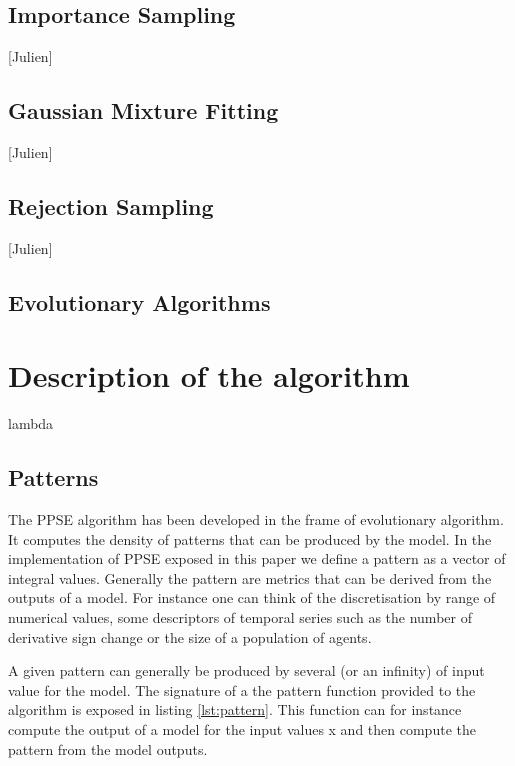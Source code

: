 \documentclass[10pt,a4paper]{article}
\theoremstyle{definition}
\theoremstyle{remark}
\begin{document}
\subsection{Importance Sampling}

[Julien]

\subsection{Gaussian Mixture Fitting}

[Julien]

\subsection{Rejection Sampling}

[Julien]

\subsection{Evolutionary Algorithms}



\section{Description of the algorithm}\label{sec. algoDescription}


lambda

\subsection{Patterns}

The PPSE algorithm has been developed in the frame of evolutionary algorithm. It computes the density of patterns that can be produced by the model. In the implementation of PPSE exposed in this paper we define a pattern as a vector of integral values. Generally the pattern are metrics that can be derived from the outputs of a model. For instance one can think of the discretisation by range of numerical values, some descriptors of temporal series such as the number of derivative sign change or the size of a population of agents. 

A given pattern can generally be produced by several (or an infinity) of input value for the model. The signature of a the pattern function provided to the algorithm is exposed in listing \ref{lst:pattern}. This function can for instance compute the output of a model for the input values x and then compute the pattern from the model outputs.
\end{document}
